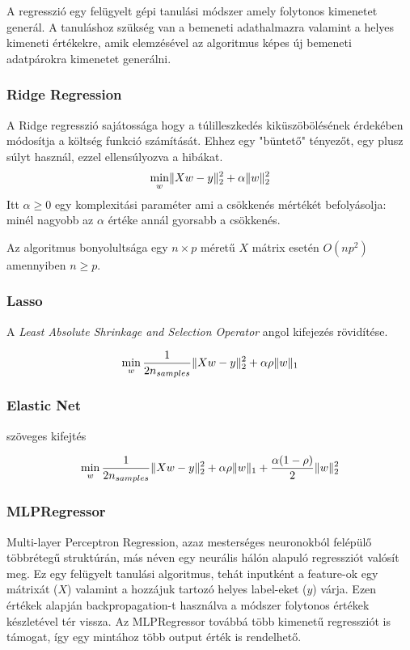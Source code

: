 A regresszió egy felügyelt gépi tanulási módszer amely folytonos kimenetet generál. A tanuláshoz szükség van a bemeneti adathalmazra valamint a helyes kimeneti értékekre, amik elemzésével az algoritmus képes új bemeneti adatpárokra kimenetet generálni.

\subsubsection{Ridge Regression}

A Ridge regresszió sajátossága hogy a túlilleszkedés kiküszöbölésének érdekében módosítja a költség funkció számítását. Ehhez egy "büntető" tényezőt, egy plusz súlyt használ, ezzel ellensúlyozva a hibákat.
$$ \min_{w} \lVert Xw-y\rVert_2^2 + \alpha \lVert w\rVert_2^2$$ 
Itt $\alpha \geq 0 $ egy komplexitási paraméter ami a csökkenés mértékét befolyásolja: minél nagyobb az $\alpha$ értéke annál gyorsabb a csökkenés.

Az algoritmus bonyolultsága egy $n \times p$ méretű $X$ mátrix esetén $O(np^2)$ amennyiben $n \geq p$. 

\subsubsection{Lasso}
A \textit{Least Absolute Shrinkage and Selection Operator} angol kifejezés rövidítése. 

$$ \min_{w}\frac{1}{2n_{samples}} \lVert Xw-y\rVert_2^2 + \alpha\rho \lVert w\rVert_1$$

\subsubsection{Elastic Net}
\TODO szöveges kifejtés

$$ \min_{w}\frac{1}{2n_{samples}} \lVert Xw-y\rVert_2^2 + \alpha\rho \lVert w\rVert_1 + \frac{\alpha(1-\rho)}{2} \lVert w\rVert_2^2$$

\subsubsection{MLPRegressor} \label{ssec:mlpregressor}
Multi-layer Perceptron Regression, azaz mesterséges neuronokból felépülő többrétegű struktúrán, más néven egy neurális hálón alapuló regressziót valósít meg. Ez egy felügyelt tanulási algoritmus, tehát inputként a feature-ok egy mátrixát ($X$) valamint a hozzájuk tartozó helyes label-eket ($y$) várja. Ezen értékek alapján backpropagation-t használva a módszer folytonos értékek készletével tér vissza. Az MLPRegressor továbbá több kimenetű regressziót is támogat, így egy mintához több output érték is rendelhető.


